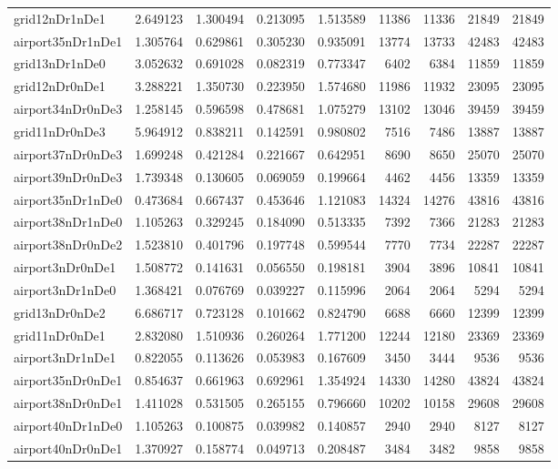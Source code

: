 \begin{longtable}{|l|r|r|r|r|r|r|r|r|}
grid12nDr1nDe1 & 2.649123 & 1.300494 & 0.213095 & 1.513589 & 11386 & 11336 & 21849 & 21849 \\
airport35nDr1nDe1 & 1.305764 & 0.629861 & 0.305230 & 0.935091 & 13774 & 13733 & 42483 & 42483 \\
grid13nDr1nDe0 & 3.052632 & 0.691028 & 0.082319 & 0.773347 & 6402 & 6384 & 11859 & 11859 \\
grid12nDr0nDe1 & 3.288221 & 1.350730 & 0.223950 & 1.574680 & 11986 & 11932 & 23095 & 23095 \\
airport34nDr0nDe3 & 1.258145 & 0.596598 & 0.478681 & 1.075279 & 13102 & 13046 & 39459 & 39459 \\
grid11nDr0nDe3 & 5.964912 & 0.838211 & 0.142591 & 0.980802 & 7516 & 7486 & 13887 & 13887 \\
airport37nDr0nDe3 & 1.699248 & 0.421284 & 0.221667 & 0.642951 & 8690 & 8650 & 25070 & 25070 \\
airport39nDr0nDe3 & 1.739348 & 0.130605 & 0.069059 & 0.199664 & 4462 & 4456 & 13359 & 13359 \\
airport35nDr1nDe0 & 0.473684 & 0.667437 & 0.453646 & 1.121083 & 14324 & 14276 & 43816 & 43816 \\
airport38nDr1nDe0 & 1.105263 & 0.329245 & 0.184090 & 0.513335 & 7392 & 7366 & 21283 & 21283 \\
airport38nDr0nDe2 & 1.523810 & 0.401796 & 0.197748 & 0.599544 & 7770 & 7734 & 22287 & 22287 \\
airport3nDr0nDe1 & 1.508772 & 0.141631 & 0.056550 & 0.198181 & 3904 & 3896 & 10841 & 10841 \\
airport3nDr1nDe0 & 1.368421 & 0.076769 & 0.039227 & 0.115996 & 2064 & 2064 & 5294 & 5294 \\
grid13nDr0nDe2 & 6.686717 & 0.723128 & 0.101662 & 0.824790 & 6688 & 6660 & 12399 & 12399 \\
grid11nDr0nDe1 & 2.832080 & 1.510936 & 0.260264 & 1.771200 & 12244 & 12180 & 23369 & 23369 \\
airport3nDr1nDe1 & 0.822055 & 0.113626 & 0.053983 & 0.167609 & 3450 & 3444 & 9536 & 9536 \\
airport35nDr0nDe1 & 0.854637 & 0.661963 & 0.692961 & 1.354924 & 14330 & 14280 & 43824 & 43824 \\
airport38nDr0nDe1 & 1.411028 & 0.531505 & 0.265155 & 0.796660 & 10202 & 10158 & 29608 & 29608 \\
airport40nDr1nDe0 & 1.105263 & 0.100875 & 0.039982 & 0.140857 & 2940 & 2940 & 8127 & 8127 \\
airport40nDr0nDe1 & 1.370927 & 0.158774 & 0.049713 & 0.208487 & 3484 & 3482 & 9858 & 9858 \\

\end{longtable}
